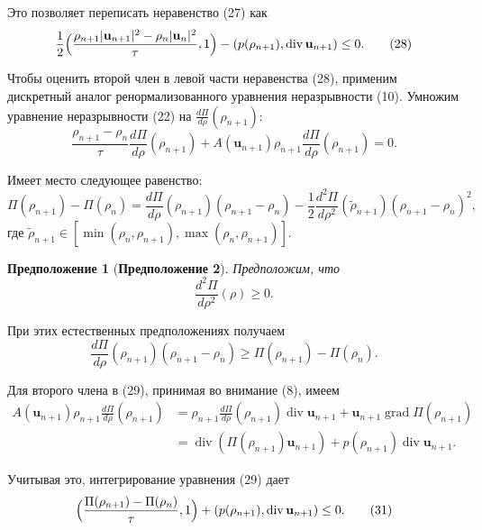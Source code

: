 \documentclass[10pt,twocolumn]{article}
\newtheorem{proposition}{Предположение}
\begin{document}
Это позволяет переписать неравенство (27) как
\begin{equation}
\frac{1}{2}\Bigl(\frac{\rho_{n + 1}|\mathbf{u}_{n + 1}|^2 - \rho_{n}|\mathbf{u}_{n}|^2}{\tau}, 1\Bigr) - (p(\rho_{n + 1}), \operatorname{div}\mathbf{u}_{n + 1}) \leq 0. \tag{28}
\end{equation}

Чтобы оценить второй член в левой части неравенства (28), применим дискретный аналог ренормализованного уравнения неразрывности (10). Умножим уравнение неразрывности (22) на \(\frac{d\Pi}{d\rho}(\rho_{n + 1})\):
\begin{equation}
\frac{\rho_{n + 1} - \rho_{n}}{\tau}\frac{d\Pi}{d\rho}(\rho_{n + 1}) + A(\mathbf{u}_{n + 1})\rho_{n + 1}\frac{d\Pi}{d\rho}(\rho_{n + 1}) = 0. \tag{29}
\end{equation}

Имеет место следующее равенство:
\[
\Pi(\rho_{n + 1}) - \Pi(\rho_{n}) = \frac{d\Pi}{d\rho}(\rho_{n + 1})(\rho_{n + 1} - \rho_{n}) - \frac{1}{2}\frac{d^2\Pi}{d\rho^2}(\tilde{\rho}_{n + 1})(\rho_{n + 1} - \rho_{n})^2,
\]
где \(\tilde{\rho}_{n + 1} \in [\min(\rho_n, \rho_{n + 1}), \max(\rho_n, \rho_{n + 1})]\).

\begin{proposition}[\textbf{Предположение 2}]
Предположим, что
\begin{equation}
\frac{d^2\Pi}{d\rho^2}(\rho) \geq 0. \tag{30}
\end{equation}
\end{proposition}

При этих естественных предположениях получаем
\[
\frac{d\Pi}{d\rho}(\rho_{n + 1})(\rho_{n + 1} - \rho_{n}) \geq \Pi(\rho_{n + 1}) - \Pi(\rho_{n}).
\]

Для второго члена в (29), принимая во внимание (8), имеем
\[
\begin{aligned}
A(\mathbf{u}_{n + 1})\rho_{n + 1}\frac{d\Pi}{d\rho}(\rho_{n + 1}) &= \rho_{n + 1}\frac{d\Pi}{d\rho}(\rho_{n + 1})\operatorname{div}\mathbf{u}_{n + 1} + \mathbf{u}_{n + 1}\operatorname{grad}\Pi(\rho_{n + 1}) \\
&= \operatorname{div}(\Pi(\rho_{n + 1})\mathbf{u}_{n + 1}) + p(\rho_{n + 1})\operatorname{div}\mathbf{u}_{n + 1}.
\end{aligned}
\]

Учитывая это, интегрирование уравнения (29) дает
\begin{equation}
\Bigl(\frac{\Pi(\rho_{n + 1}) - \Pi(\rho_{n})}{\tau}, 1\Bigr) + (p(\rho_{n + 1}), \operatorname{div}\mathbf{u}_{n + 1}) \leq 0. \tag{31}
\end{equation}
\end{document}
